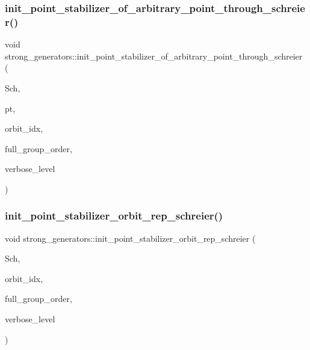 \subsubsection{\texorpdfstring{init\+\_\+point\+\_\+stabilizer\+\_\+of\+\_\+arbitrary\+\_\+point\+\_\+through\+\_\+schreier()}{init\_point\_stabilizer\_of\_arbitrary\_point\_through\_schreier()}}
{\footnotesize\ttfamily void strong\+\_\+generators\+::init\+\_\+point\+\_\+stabilizer\+\_\+of\+\_\+arbitrary\+\_\+point\+\_\+through\+\_\+schreier (\begin{DoxyParamCaption}\item[{\mbox{\hyperlink{classschreier}{schreier}} $\ast$}]{Sch,  }\item[{\mbox{\hyperlink{galois_8h_a09fddde158a3a20bd2dcadb609de11dc}{I\+NT}}}]{pt,  }\item[{\mbox{\hyperlink{galois_8h_a09fddde158a3a20bd2dcadb609de11dc}{I\+NT}} \&}]{orbit\+\_\+idx,  }\item[{\mbox{\hyperlink{classlonginteger__object}{longinteger\+\_\+object}} \&}]{full\+\_\+group\+\_\+order,  }\item[{\mbox{\hyperlink{galois_8h_a09fddde158a3a20bd2dcadb609de11dc}{I\+NT}}}]{verbose\+\_\+level }\end{DoxyParamCaption})}

\mbox{\label{classstrong__generators_abca7016c4618063c8c65a62c4ca889b9}} 
\subsubsection{\texorpdfstring{init\+\_\+point\+\_\+stabilizer\+\_\+orbit\+\_\+rep\+\_\+schreier()}{init\_point\_stabilizer\_orbit\_rep\_schreier()}}
{\footnotesize\ttfamily void strong\+\_\+generators\+::init\+\_\+point\+\_\+stabilizer\+\_\+orbit\+\_\+rep\+\_\+schreier (\begin{DoxyParamCaption}\item[{\mbox{\hyperlink{classschreier}{schreier}} $\ast$}]{Sch,  }\item[{\mbox{\hyperlink{galois_8h_a09fddde158a3a20bd2dcadb609de11dc}{I\+NT}}}]{orbit\+\_\+idx,  }\item[{\mbox{\hyperlink{classlonginteger__object}{longinteger\+\_\+object}} \&}]{full\+\_\+group\+\_\+order,  }\item[{\mbox{\hyperlink{galois_8h_a09fddde158a3a20bd2dcadb609de11dc}{I\+NT}}}]{verbose\+\_\+level }\end{DoxyParamCaption})}


